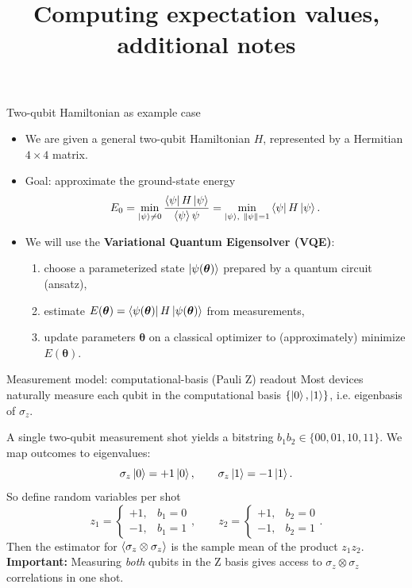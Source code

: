 \documentclass[aspectratio=169]{beamer}
\title[VQE for a Two-Qubit Hamiltonian]{Computing expectation values, additional notes}
\author{}
\date{}
\newcommand{\Z}{\sigma_z}
\begin{document}
\begin{frame}
\titlepage
\end{frame}

\begin{frame}{Two-qubit Hamiltonian as example case}
\begin{itemize}
  \item We are given a general two-qubit Hamiltonian \(H\), represented by a Hermitian \(4\times 4\) matrix.
  \item Goal: approximate the ground-state energy
  \[
    E_0 = \min_{\ket{\psi}\neq 0}\frac{\bra{\psi}H\ket{\psi}}{\braket{\psi}{\psi}}
    = \min_{\ket{\psi}, \ \|\psi\|=1} \bra{\psi}H\ket{\psi}.
  \]
  \item We will use the \textbf{Variational Quantum Eigensolver (VQE)}:
  \begin{enumerate}
    \item choose a parameterized state \(\ket{\psi(\bm{\theta})}\) prepared by a quantum circuit (ansatz),
    \item estimate \(E(\bm{\theta})=\bra{\psi(\bm{\theta})}H\ket{\psi(\bm{\theta})}\) from measurements,
    \item update parameters \(\bm{\theta}\) on a classical optimizer to (approximately) minimize \(E(\bm{\theta})\).
  \end{enumerate}
\end{itemize}
\end{frame}

\begin{frame}{Measurement model: computational-basis (Pauli Z) readout}
Most devices naturally measure each qubit in the computational basis
\(\{\ket{0},\ket{1}\}\), i.e. eigenbasis of \(\Z\).

\medskip
A single two-qubit measurement shot yields a bitstring \(b_1 b_2\in\{00,01,10,11\}\).
We map outcomes to eigenvalues:
\[
\Z\ket{0}=+1\ket{0},\qquad \Z\ket{1}=-1\ket{1}.
\]
So define random variables per shot
\[
z_1 = \begin{cases}+1,& b_1=0\\-1,& b_1=1\end{cases},
\qquad
z_2 = \begin{cases}+1,& b_2=0\\-1,& b_2=1\end{cases}.
\]
Then the estimator for \(\expval{\Z\otimes\Z}\) is the sample mean of the product \(z_1 z_2\).
\textbf{Important:} Measuring \emph{both} qubits in the Z basis gives access to \(\Z\otimes \Z\) correlations in one shot.
\end{frame}
\end{document}

